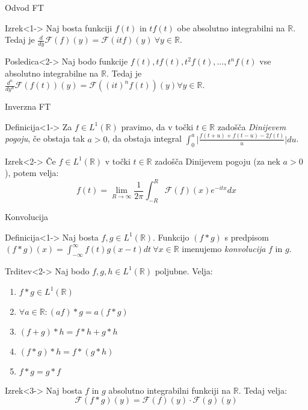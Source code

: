 \documentclass[t, 8pt]{beamer} %
\newcommand{\abs}[1]{\ensuremath{\lvert #1 \rvert}}
\newcommand{\mth}[1]{\ensuremath{\mathbb{#1}}}
\newcommand{\R}{\mth{R}}
\newcommand{\pojem}[1]{\emph{#1}}
\begin{document}
		\begin{frame}{Odvod FT}
			\begin{block}{Izrek}<1->
				Naj bosta funkciji $f(t)$ in $tf(t)$ obe absolutno integrabilni na $\R$. Tedaj je $\frac{d}{dy}\mathcal{F}(f)(y) = \mathcal{F}(itf)(y)~\forall y\in\R$.
			\end{block}
			\begin{block}{Posledica}<2->
				Naj bodo funkcije $f(t), tf(t), t^2f(t), \ldots, t^nf(t)$ vse absolutno integrabilne na $\R$. Tedaj je $\frac{d^n}{dy^n}\mathcal{F}(f(t))(y) = \mathcal{F}((it)^nf(t))(y) \forall y\in \R$.
			\end{block}
		\end{frame}
		
		\begin{frame}{Inverzna FT}
			\begin{block}{Definicija}<1->
				Za $f\in L^1(\R)$ pravimo, da v točki $t\in\R$ zadošča \pojem{Dinijevem pogoju}, če obstaja tak $a>0$, da obstaja integral $\int_{0}^a \abs{\frac{f(t+u) + f(t-u) - 2f(t)}{u}}du$.
			\end{block}
			\begin{block}{Izrek}<2->
					Če $f\in L^1(\R)$ v točki $t\in\R$ zadošča Dinijevem pogoju (za nek $a>0$), potem velja: $$f(t) = \lim_{R\to\infty}\frac{1}{2\pi}\int_{-R}^{R}\mathcal{F}(f)(x)e^{-itx} dx$$
			\end{block}
		\end{frame}
		
		\begin{frame}{Konvolucija}
			\begin{block}{Definicija}<1->
				Naj bosta $f, g\in L^1(\R)$. Funkcijo $(f*g)$ s predpisom $(f*g)(x) = \int_{-\infty}^{\infty}f(t)g(x-t)dt ~\forall x\in\R$ imenujemo \pojem{konvolucija} $f$ in $g$.
			\end{block}
			\begin{block}{Trditev}<2->
				Naj bodo $f, g, h\in L^1(\R)$ poljubne. Velja: \begin{enumerate}
					\item $f*g \in L^1(\R)$
					\item $\forall a\in \R: (af)*g = a(f*g)$
					\item $(f+g)*h = f*h + g*h$
					\item $(f*g)*h = f*(g*h)$
					\item $f*g= g*f$
				\end{enumerate} 
			\end{block}
			\begin{block}{Izrek}<3->
				Naj bosta $f$ in $g$ absolutno integrabilni funkciji na $\R$. Tedaj velja: $$\mathcal{F}(f*g)(y) = \mathcal{F}(f)(y)\cdot\mathcal{F}(g)(y)$$
			\end{block}
		\end{frame}
		
\end{document}

